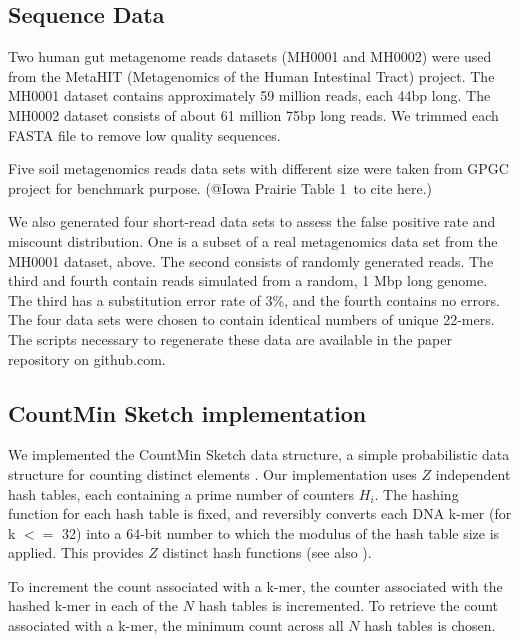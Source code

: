 \documentclass{article}
\begin{document}
\subsection{Sequence Data}

Two human gut metagenome reads datasets (MH0001 and MH0002) were used from the 
MetaHIT (Metagenomics of the Human Intestinal Tract) project\cite{Qin2010}. 
The MH0001 dataset contains approximately 59 million reads, each 44bp long. 
The MH0002 dataset consists of about 61 million 75bp long reads.
We trimmed each FASTA file to remove low quality sequences. 

Five soil metagenomics reads data sets with different size were taken
from GPGC project for benchmark purpose.
(@Iowa Prairie Table 1\ to cite here.)

We also generated four short-read data sets to assess the false
positive rate and miscount distribution. One is a subset of a real
metagenomics data set from the MH0001 dataset, above. The second
consists of randomly generated reads. The third and fourth contain
reads simulated from a random, 1 Mbp long genome.  The third has a
substitution error rate of 3\%, and the fourth contains no errors. The
four data sets were chosen to contain identical numbers of unique
22-mers.  The scripts necessary to regenerate these data are available
in the paper repository on github.com.


\subsection{CountMin Sketch implementation}

We implemented the CountMin Sketch data structure, a simple
probabilistic data structure for counting distinct elements
\cite{Cormode2005}.  Our implementation uses $Z$ independent hash
tables, each containing a prime number of counters $H_i$.  The hashing
function for each hash table is fixed, and reversibly converts each
DNA k-mer (for k $<=$ 32) into a 64-bit number to which the modulus of
the hash table size is applied.  This provides $Z$ distinct hash
functions (see also \cite{adina2013}).

To increment the count associated with a k-mer, the counter associated
with the hashed k-mer in each of the $N$ hash tables is incremented.
To retrieve the count associated with a k-mer, the minimum count
across all $N$ hash tables is chosen.
\end{document}
